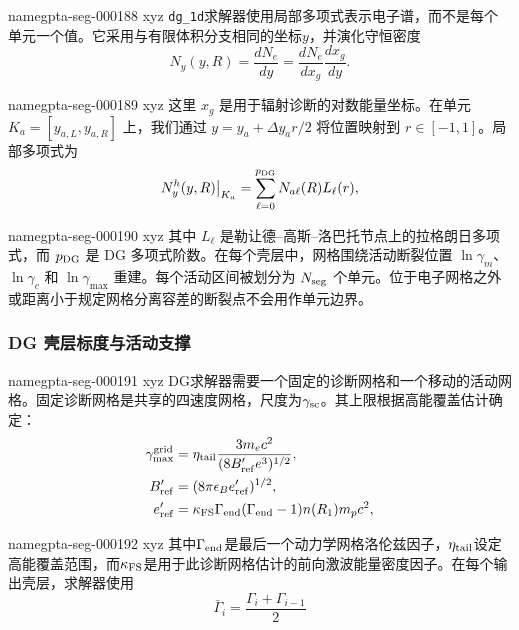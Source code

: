 \documentclass[twocolumn]{aastex702}
\makeatletter
\providecommand{\gptareaderanchor}[1]{\pdfdest name{#1} xyz}%
\providecommand{\gptareaderanchor}[1]{\special{pdf:dest (#1) [ @thispage /XYZ @xpos @ypos null ]}}%
\makeatother
\begin{document}
\gptareaderanchor{gpta-seg-000188}%
\texttt{dg\_1d}求解器使用局部多项式表示电子谱，而不是每个单元一个值。它采用与有限体积分支相同的坐标\(y\)，并演化守恒密度
\begin{equation}
N_y(y,R)=\frac{dN_e}{dy}
=\frac{dN_e}{dx_g}\frac{dx_g}{dy}.
\end{equation}

\gptareaderanchor{gpta-seg-000189}%
这里 \(x_g\) 是用于辐射诊断的对数能量坐标。在单元 \(K_a=[y_{a,L},y_{a,R}]\) 上，我们通过 \(y=y_a+\Delta y_ar/2\) 将位置映射到 \(r\in[-1,1]\)。局部多项式为
\begin{equation}
N_y^h(y,R)\big|_{K_a}=
\sum_{\ell=0}^{p_{\rm DG}}N_{a\ell}(R)L_\ell(r),
\end{equation}

\gptareaderanchor{gpta-seg-000190}%
其中 \(L_\ell\) 是勒让德–高斯–洛巴托节点上的拉格朗日多项式，而 \(p_{\rm DG}\) 是 DG 多项式阶数。在每个壳层中，网格围绕活动断裂位置 \(\ln\gamma_m\)、\(\ln\gamma_c\) 和 \(\ln\gamma_{\max}\) 重建。每个活动区间被划分为 \(N_{\rm seg}\) 个单元。位于电子网格之外或距离小于规定网格分离容差的断裂点不会用作单元边界。

\subsubsection{DG 壳层标度与活动支撑}


\gptareaderanchor{gpta-seg-000191}%
DG求解器需要一个固定的诊断网格和一个移动的活动网格。固定诊断网格是共享的四速度网格，尺度为\(\gamma_{\rm sc}\)。其上限根据高能覆盖估计确定：
\begin{equation}
\begin{aligned}
\gamma_{\max}^{\rm grid}
&=\eta_{\rm tail}
\frac{3m_ec^2}{(8B'_{\rm ref}e^3)^{1/2}},\\
B'_{\rm ref}&=(8\pi\epsilon_B e'_{\rm ref})^{1/2},\\
e'_{\rm ref}
&=\kappa_{\rm FS}\Gamma_{\rm end}(\Gamma_{\rm end}-1)n(R_1)m_pc^2,
\end{aligned}
\end{equation}

\gptareaderanchor{gpta-seg-000192}%
其中\(\Gamma_{\rm end}\)是最后一个动力学网格洛伦兹因子，\(\eta_{\rm tail}\)设定高能覆盖范围，而\(\kappa_{\rm FS}\)是用于此诊断网格估计的前向激波能量密度因子。在每个输出壳层，求解器使用
\begin{equation}
\bar\Gamma_i=\frac{\Gamma_i+\Gamma_{i-1}}{2}
\end{equation}
\end{document}

